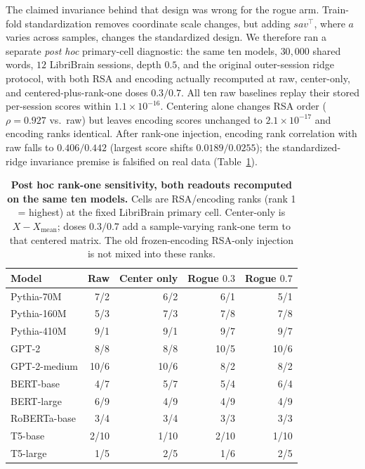 \documentclass{article}
\begin{document}
The claimed invariance behind that design was wrong for the rogue arm. Train-fold standardization
removes coordinate scale changes, but adding $s a v^\top$, where $a$ varies across samples,
changes the standardized design. We therefore ran a separate \emph{post hoc} primary-cell diagnostic:
the same ten models, $30{,}000$ shared words, $12$ LibriBrain sessions, depth $0.5$, and the
original outer-session ridge protocol, with both RSA and encoding actually recomputed at raw,
center-only, and centered-plus-rank-one doses $0.3/0.7$. All ten raw baselines replay their
stored per-session scores within $1.1\times10^{-16}$. Centering alone changes RSA order
($\rho=0.927$ vs.\ raw) but leaves encoding scores unchanged to $2.1\times10^{-17}$ and
encoding ranks identical. After rank-one injection, encoding rank correlation with raw falls
to $0.406/0.442$ (largest score shifts $0.0189/0.0255$); the standardized-ridge invariance
premise is falsified on real data (Table~\ref{tab:rogue-ranks}).

\begin{table}[t]
\centering\footnotesize
\caption{\textbf{Post hoc rank-one sensitivity, both readouts recomputed on the same ten models.}
Cells are RSA/encoding ranks (rank 1 = highest) at the fixed LibriBrain primary cell.
Center-only is $X-X_{\mathrm{mean}}$; doses $0.3/0.7$ add a sample-varying rank-one term to that
centered matrix. The old frozen-encoding RSA-only injection is not mixed into these ranks.}
\label{tab:rogue-ranks}
\begin{tabular}{lrrrr}
\toprule
Model & Raw & Center only & Rogue $0.3$ & Rogue $0.7$ \\
\midrule
Pythia-70M     & 7/2  & 6/2  & 6/1  & 5/1 \\
Pythia-160M    & 5/3  & 7/3  & 7/8  & 7/8 \\
Pythia-410M    & 9/1  & 9/1  & 9/7  & 9/7 \\
GPT-2          & 8/8  & 8/8  & 10/5 & 10/6 \\
GPT-2-medium   & 10/6 & 10/6 & 8/2  & 8/2 \\
BERT-base      & 4/7  & 5/7  & 5/4  & 6/4 \\
BERT-large     & 6/9  & 4/9  & 4/9  & 4/9 \\
RoBERTa-base   & 3/4  & 3/4  & 3/3  & 3/3 \\
T5-base        & 2/10 & 1/10 & 2/10 & 1/10 \\
T5-large       & 1/5  & 2/5  & 1/6  & 2/5 \\
\bottomrule
\end{tabular}
\end{table}
\end{document}

